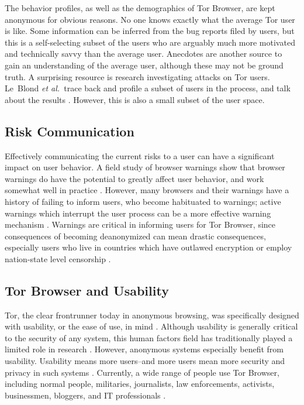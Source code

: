 \documentclass{sig-alternate-hotpets15}
\def\etal{{\it et al.~}}
\begin{document}
The behavior profiles, as well as the demographics of Tor Browser, are kept anonymous for obvious reasons. No one knows exactly what the average Tor user is like. Some information can be inferred from the bug reports filed by users, but this is a self-selecting subset of the users who are arguably much more motivated and technically savvy than the average user. Anecdotes are another source to gain an understanding of the average user, although these may not be ground truth. A surprising resource is research investigating attacks on Tor users. Le~Blond \etal trace back and profile a subset of users in the process, and talk about the results \cite{blond2011one}. However, this is also a small subset of the user space.  

\subsection{Risk Communication}
Effectively communicating the current risks to a user can have a significant impact on user behavior. A field study of browser warnings show that browser warnings do have the potential to greatly affect user behavior, and work somewhat well in practice \cite{akhawe2013alice}. However, many browsers and their warnings have a history of failing to inform users, who become habituated to warnings; active warnings which interrupt the user process can be a more effective warning mechanism \cite{egelman2008you}. Warnings are critical in informing users for Tor Browser, since consequences of becoming deanonymized can mean drastic consequences, especially users who live in countries which have outlawed encryption or employ nation-state level censorship \cite{crypto_wikipedia_2015,china_wikipedia_2015}. 

\subsection{Tor Browser and Usability}

Tor, the clear frontrunner today in anonymous browsing, was specifically designed with usability, or the ease of use, in mind \cite{tor_wikipedia_2015, dingledine2004tor}. Although usability is generally critical to the security of any system, this human factors field has traditionally played a limited role in research \cite{cranor2005security}. However, anonymous systems especially benefit from usability. Usability means more users--and more users mean more security and privacy in such systems \cite{dingledine2006anonymity}. Currently, a wide range of people use Tor Browser, including normal people, militaries, journalists, law enforcements, activists, businessmen, bloggers, and IT professionals \cite{torproject_2015}. 
\end{document}
